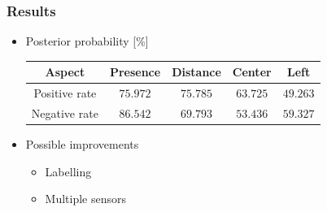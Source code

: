 \documentclass[10pt,xcolor=pdflatex]{beamer}
\begin{document}

\begin{frame}\frametitle{Results}
    \begin{itemize}
        \item Posterior probability [\%] 
    \begin{center}
        \begin{tabular}{|c|c c c c|} \hline
            \textbf{Aspect} & \textbf{Presence} & \textbf{Distance} & \textbf{Center}       & \textbf{Left} \\ \hline
            Positive rate   & $75.972$          & $75.785$          & $63.725$              & $49.263$            \\
            Negative rate   & $86.542$          & $69.793$          & $53.436$              & $59.327$            \\ \hline
        \end{tabular}
    \end{center}
        \item Possible improvements
            \begin{itemize}
                \item Labelling
                \item Multiple sensors
            \end{itemize}
    \end{itemize}

\end{frame}


\end{document}
